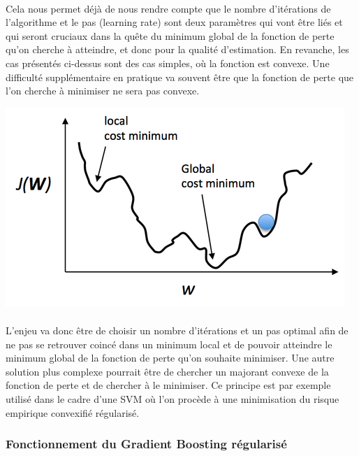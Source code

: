 \documentclass[14pt, openany]{article}
\begin{document}
\paragraph{}
Cela nous permet déjà de nous rendre compte que le nombre d'itérations de l'algorithme et le pas (learning rate) sont deux paramètres qui vont être liés et qui seront cruciaux dans la quête du minimum global de la fonction de perte qu'on cherche à atteindre, et donc pour la qualité d'estimation. En revanche, les cas présentés ci-dessus sont des cas simples, où la fonction est convexe. Une difficulté supplémentaire en pratique va souvent être que la fonction de perte que l'on cherche à minimiser ne sera pas convexe.
\begin{center}
\includegraphics[scale=0.7]{Images/nonconvex-cost.png}
\end{center}
\begin{center}
\end{center}
\paragraph{}
L'enjeu va donc être de choisir un nombre d'itérations et un pas optimal afin de ne pas se retrouver \og coincé \fg{} dans un minimum local et de pouvoir atteindre le minimum global de la fonction de perte qu'on souhaite minimiser. Une autre solution plus complexe pourrait être de chercher un majorant convexe de la fonction de perte et de chercher à le minimiser. Ce principe est par exemple utilisé dans le cadre d'une SVM où l'on procède à une minimisation du risque empirique convexifié régularisé. 
\subsubsection{Fonctionnement du Gradient Boosting régularisé}
\end{document}

